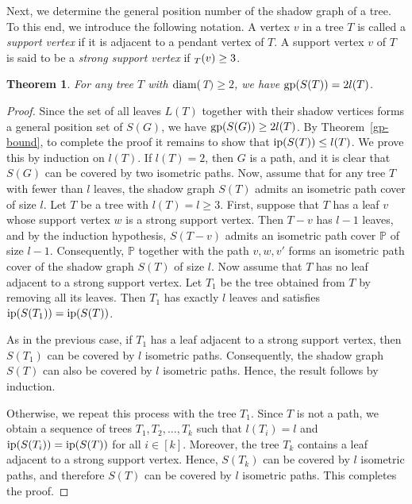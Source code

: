\documentclass[a4paper,12pt]{article}
\newtheorem{theorem}{Theorem}[section]
\newcommand{\gp}{{\rm gp}}
\newcommand{\diam}{\rm diam}
\newcommand{\ip}{{\rm ip}}
\let\deg\relax
\DeclareMathOperator {\deg} {deg}
\begin{document}
{Next, we determine the general position number of the shadow graph of a tree. 
To this end, we introduce the following notation. 
A vertex $v$ in a tree $T$ is called a \emph{support vertex} if it is adjacent to a pendant vertex of $T$. 
A support vertex $v$ of $T$ is said to be a \emph{strong support vertex} if $\deg_T(v)\ge 3$. 
\begin{theorem}
      For any tree $T$ with $\diam($T$) \geq 2$, we have $\gp(S(T))=2l(T)$.
  \end{theorem}
  \begin{proof}
      Since the set of all leaves $L(T)$ together with their shadow vertices forms a general position set of $S(G)$, we have $\gp(S(G)) \ge 2l(T)$.
 By Theorem~\ref{gp-bound}, to complete the proof it remains to show that $\ip(S(T)) \leq l(T)$.
       We prove this by induction on $l(T)$. 
If $l(T)=2$, then $G$ is a path, and it is clear that $S(G)$ can be covered by two isometric paths.
 Now, assume that for any tree $T$ with fewer than $l$ leaves, the shadow graph $S(T)$ admits an isometric path cover of size $l$. 
Let $T$ be a tree with $l(T)=l \ge 3$. 
First, suppose that $T$ has a leaf $v$ whose support vertex $w$ is a strong support vertex. 
Then $T-v$ has $l-1$ leaves, and by the induction hypothesis, $S(T-v)$ admits an isometric path cover $\mathbb{P}$ of size $l-1$. 
Consequently, $\mathbb{P}$ together with the path $v,w,v'$ forms an isometric path cover of the shadow graph $S(T)$ of size $l$.
      Now assume that $T$ has no leaf adjacent to a strong support vertex. Let $T_1$ be the tree obtained from $T$ by removing all its leaves. Then $T_1$ has exactly $l$ leaves and satisfies $\ip(S(T_1))=\ip(S(T))$. 

As in the previous case, if $T_1$ has a leaf adjacent to a strong support vertex, then $S(T_1)$ can be covered by $l$ isometric paths. Consequently, the shadow graph $S(T)$ can also be covered by $l$ isometric paths. Hence, the result follows by induction. 

Otherwise, we repeat this process with the tree $T_1$. Since $T$ is not a path, we obtain a sequence of trees $T_1, T_2, \dots, T_k$ such that $l(T_i)=l$ and $\ip(S(T_i))=\ip(S(T))$ for all $i\in[k]$. Moreover, the tree $T_k$ contains a leaf adjacent to a strong support vertex. Hence, $S(T_k)$ can be covered by $l$ isometric paths, and therefore $S(T)$ can be covered by $l$ isometric paths. This completes the proof.  
  \end{proof}
 


}
\end{document}
